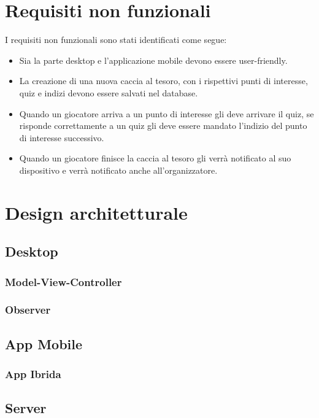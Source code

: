 \documentclass[12pt, italian]{article}
\begin{document}
\section{Requisiti non funzionali}
I requisiti non funzionali sono stati identificati come segue:
\begin{itemize}
	\item Sia la parte desktop e l'applicazione mobile devono essere user-friendly.
	\item La creazione di una nuova caccia al tesoro, con i rispettivi punti di interesse, quiz e indizi devono essere salvati nel database.
	\item Quando un giocatore arriva a un punto di interesse gli deve arrivare il quiz, se risponde correttamente a un quiz gli deve essere mandato l'indizio del punto di interesse successivo.
	\item Quando un giocatore finisce la caccia al tesoro gli verrà notificato al suo dispositivo e verrà notificato anche all'organizzatore.
\end{itemize}


\section{Design architetturale}
\subsection{Desktop}
\subsubsection{Model-View-Controller}
\subsubsection{Observer}
\subsection{App Mobile}
\subsubsection{App Ibrida}
\subsection{Server}
\end{document}
